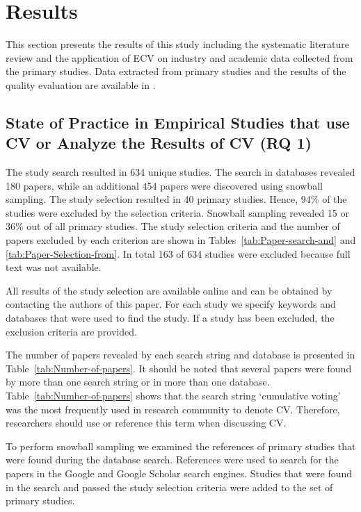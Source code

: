 \section{\label{results}Results}
This section presents the results of this study including the systematic literature review and the application of ECV on industry and academic data collected from the primary studies.
Data extracted from primary studies and the results of the quality evaluation are available in \cite{Rinkevics2011a}.

\subsection{State of Practice in Empirical Studies that use CV or Analyze the Results of CV (RQ 1)\label{rq1}}
The study search resulted in 634 unique studies. The search in databases revealed 180 papers, while an additional 454 papers were discovered using snowball sampling.
The study selection resulted in 40 primary studies. Hence, 94\% of the studies were excluded by the selection criteria.
Snowball sampling revealed 15 or 36\% out of all primary studies.
The study selection criteria and the number of papers excluded by each criterion are shown in Tables~\ref{tab:Paper-search-and} and \ref{tab:Paper-Selection-from}.
In total 163 of 634 studies were excluded because full text was not available.

All results of the study selection are available online and can be obtained by contacting the authors of this paper.
For each study we specify keywords and databases that were used to find the study.
If a study has been excluded, the exclusion criteria are provided.

The number of papers revealed by each search string and database is
presented in Table~\ref{tab:Number-of-papers}. It should be noted
that several papers were found by more than one search string or in
more than one database. Table~\ref{tab:Number-of-papers} shows that
the search string `cumulative voting' was the most frequently used
in research community to denote CV. Therefore, researchers should use 
or reference this term when discussing CV.

To perform snowball sampling we examined the references of primary studies that were found during the database search.
References were used to search for the papers in the Google and Google Scholar search engines.
Studies that were found in the search and passed the study selection criteria were added to the set of primary studies.

